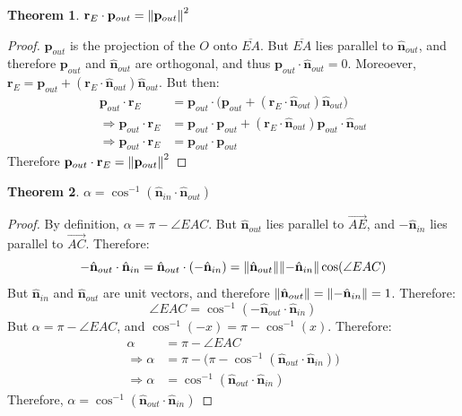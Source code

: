 \documentclass{article}
\theoremstyle{mystyle}
\newtheorem{theorem}{Theorem}[section]
\begin{document}
\begin{theorem}
\label{theorem:r_e_dot_p_out_equal_p_out_square}
$\mathbf{r}_{E}\cdot \mathbf{p}_{out} = \norm{\mathbf{p}_{out}}^2$
\end{theorem}
\begin{proof}
$\mathbf{p}_{out}$ is the projection of the $O$ onto $\overline{EA}$. But $\overline{EA}$ lies parallel to $\hat{\mathbf{n}}_{out}$, and therefore $\mathbf{p}_{out}$ and $\hat{\mathbf{n}}_{out}$ are orthogonal, and thus $\mathbf{p}_{out}\cdot\hat{\mathbf{n}}_{out}=0$. Moreoever, $\mathbf{r}_{E} = \mathbf{p}_{out}+(\mathbf{r}_{E}\cdot \hat{\mathbf{n}}_{out}) \hat{\mathbf{n}}_{out}$. But then:
\begin{align}
    \mathbf{p}_{out}\cdot \mathbf{r}_{E} &= \mathbf{p}_{out}\cdot\big(\mathbf{p}_{out}+(\mathbf{r}_{E}\cdot \hat{\mathbf{n}}_{out})\hat{\mathbf{n}}_{out}\big)\\ 
    \Rightarrow \mathbf{p}_{out}\cdot \mathbf{r}_{E} &= \mathbf{p}_{out}\cdot \mathbf{p}_{out} + (\mathbf{r}_{E}\cdot \hat{\mathbf{n}}_{out}) \mathbf{p}_{out}\cdot \hat{\mathbf{n}}_{out}\\
    \Rightarrow \mathbf{p}_{out}\cdot \mathbf{r}_{E} &= \mathbf{p}_{out}\cdot \mathbf{p}_{out}
\end{align}
Therefore $\mathbf{p}_{out}\cdot \mathbf{r}_{E} = \norm{\mathbf{p}_{out}}^2$
\end{proof}
\begin{theorem}
$\alpha = \cos^{-1}(\hat{\mathbf{n}}_{in}\cdot \hat{\mathbf{n}}_{out})$
\end{theorem}
\begin{proof}
By definition, $\alpha = \pi - \angle EAC$. But $\hat{\mathbf{n}}_{out}$ lies parallel to $\overrightarrow{AE}$, and $-\hat{\mathbf{n}}_{in}$ lies parallel to $\overrightarrow{AC}$. Therefore:
\begin{equation}
-\hat{\mathbf{n}}_{out}\cdot \hat{\mathbf{n}}_{in} = \hat{\mathbf{n}}_{out}\cdot (-\hat{\mathbf{n}}_{in}) = \norm{\hat{\mathbf{n}}_{out}}\norm{-\hat{\mathbf{n}}_{in}}\cos(\angle EAC)
\end{equation}
But $\hat{\mathbf{n}}_{in}$ and $\hat{\mathbf{n}}_{out}$ are unit vectors, and therefore $\norm{\hat{\mathbf{n}}_{out}} = \norm{-\hat{\mathbf{n}}_{in}} = 1$. Therefore:
\begin{equation}
    \angle EAC = \cos^{-1}(-\hat{\mathbf{n}}_{out}\cdot\hat{\mathbf{n}}_{in})
\end{equation}
But $\alpha = \pi - \angle EAC$, and $\cos^{-1}(-x) = \pi - \cos^{-1}(x)$. Therefore:
\begin{align}
    \alpha &= \pi - \angle EAC \\
    \Rightarrow \alpha &= \pi - \big(\pi - \cos^{-1}(\hat{\mathbf{n}}_{out}\cdot \hat{\mathbf{n}}_{in})\big)\\
    \Rightarrow \alpha &= \cos^{-1}(\hat{\mathbf{n}}_{out}\cdot \hat{\mathbf{n}}_{in})
\end{align}
Therefore, $\alpha = \cos^{-1}(\hat{\mathbf{n}}_{out}\cdot \hat{\mathbf{n}}_{in})$
\end{proof}
\end{document}
